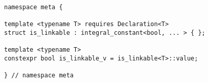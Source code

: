 
\begin{verbatim}
namespace meta {

template <typename T> requires Declaration<T>
struct is_linkable : integral_constant<bool, ... > { };

template <typename T>
constexpr bool is_linkable_v = is_linkable<T>::value;

} // namespace meta
\end{verbatim}
